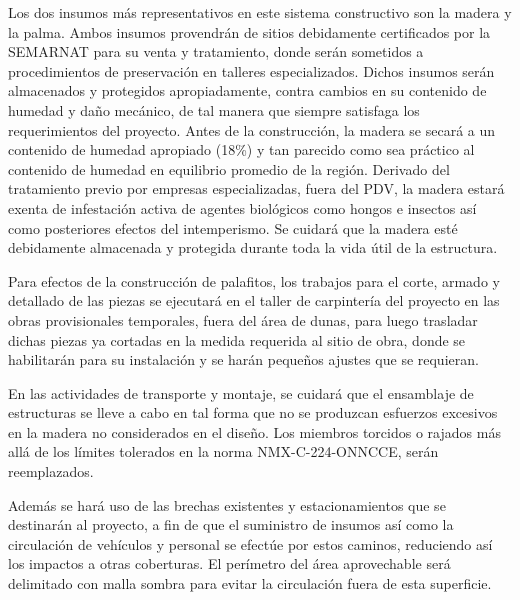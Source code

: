 \documentclass{article}
\begin{document}
Los dos insumos más representativos en este sistema constructivo son la madera y la palma. Ambos insumos provendrán de sitios debidamente certificados por la SEMARNAT para su venta y tratamiento, donde serán sometidos a procedimientos de preservación en talleres especializados. Dichos insumos serán almacenados y protegidos apropiadamente, contra cambios en su contenido de humedad y daño mecánico, de tal manera que siempre satisfaga los requerimientos del proyecto. Antes de la construcción, la madera se secará a un contenido de humedad apropiado (18\%) y tan parecido como sea práctico al contenido de humedad en equilibrio promedio de la región. Derivado del tratamiento previo por empresas especializadas, fuera del PDV, la madera estará exenta de infestación activa de agentes biológicos como hongos e insectos así como posteriores efectos del intemperismo. Se cuidará que la madera esté debidamente almacenada y protegida durante toda la vida útil de la estructura. 


\bigskip

Para efectos de la construcción de palafitos, los trabajos para el corte, armado y detallado de las piezas se ejecutará en el taller de carpintería del proyecto en las obras provisionales temporales, fuera del área de dunas, para luego trasladar dichas piezas ya cortadas en la medida requerida al sitio de obra, donde se habilitarán para su instalación y se harán pequeños ajustes que se requieran.


\bigskip

En las actividades de transporte y montaje, se cuidará que el ensamblaje de estructuras se lleve a cabo en tal forma que no se produzcan esfuerzos excesivos en la madera no considerados en el diseño. Los miembros torcidos o rajados más allá de los límites tolerados en la norma NMX-C-224-ONNCCE, serán reemplazados.


\bigskip

Además se hará uso de las brechas existentes y estacionamientos que se destinarán al proyecto, a fin de que el suministro de insumos así como la circulación de vehículos y personal se efectúe por estos caminos, reduciendo así los impactos a otras coberturas. El perímetro del área aprovechable será delimitado con malla sombra para evitar la circulación fuera de esta superficie.


\bigskip
\end{document}
